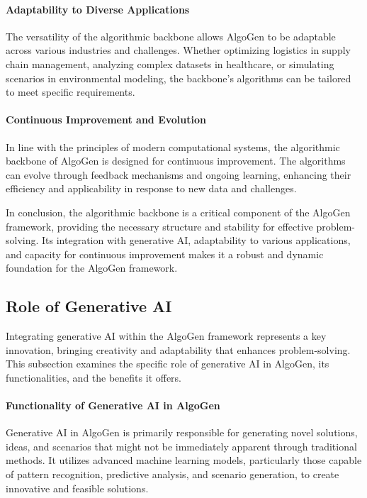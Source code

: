 \documentclass{article}
\begin{document}
\paragraph{Adaptability to Diverse Applications}
The versatility of the algorithmic backbone allows AlgoGen to be adaptable across various industries and challenges. Whether optimizing logistics in supply chain management, analyzing complex datasets in healthcare, or simulating scenarios in environmental modeling, the backbone’s algorithms can be tailored to meet specific requirements.

\paragraph{Continuous Improvement and Evolution}
In line with the principles of modern computational systems, the algorithmic backbone of AlgoGen is designed for continuous improvement. The algorithms can evolve through feedback mechanisms and ongoing learning, enhancing their efficiency and applicability in response to new data and challenges.

In conclusion, the algorithmic backbone is a critical component of the AlgoGen framework, providing the necessary structure and stability for effective problem-solving. Its integration with generative AI, adaptability to various applications, and capacity for continuous improvement makes it a robust and dynamic foundation for the AlgoGen framework.



\subsection{Role of Generative AI}

Integrating generative AI within the AlgoGen framework represents a key innovation, bringing creativity and adaptability that enhances problem-solving. This subsection examines the specific role of generative AI in AlgoGen, its functionalities, and the benefits it offers.

\paragraph{Functionality of Generative AI in AlgoGen}
Generative AI in AlgoGen is primarily responsible for generating novel solutions, ideas, and scenarios that might not be immediately apparent through traditional methods. It utilizes advanced machine learning models, particularly those capable of pattern recognition, predictive analysis, and scenario generation, to create innovative and feasible solutions.
\end{document}
